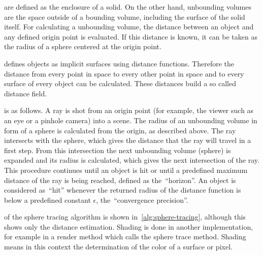 \documentclass[%
    a4paper,    %
    justified,  %
    nobib,      %
    openany     %
]{tufte-book}
\begin{document}
 are defined as the enclosure of a solid. On the
other hand, unbounding volumes are the space outside of a bounding volume,
including the surface of the solid itself. For calculating a unbounding volume,
the distance between an object and any defined origin point is evaluated. If
this distance is known, it can be taken as the radius of a sphere centered at
the origin point.

 defines objects as implicit surfaces using distance
functions. Therefore the distance from every point in space to every other point
in space and to every surface of every object can be calculated. These distances
build a so called distance field.

 is as follows. A ray is shot
from an origin point (for example, the viewer such as an eye or a pinhole camera) into a scene.
The radius of an unbounding volume in form of a sphere is calculated from
the origin, as described above. The ray intersects with the sphere, which gives
the distance that the ray will travel in a first step. From this
intersection the next unbounding volume (sphere) is expanded and its radius is
calculated, which gives the next intersection of the ray. This procedure
continues until an object is hit or until a predefined maximum distance of
the ray is being reached, defined as the~\enquote{horizon}. An object is
considered as~\enquote{hit} whenever the
returned radius of the distance function is below a predefined constant
$\epsilon$, the~\enquote{convergence precision}.

 of the sphere tracing algorithm is shown
in~\autoref{alg:sphere-tracing}, although this shows only the distance
estimation. Shading is done in another implementation, for example in a
render method which calls the sphere trace method. Shading means in this context
the determination of the color of a surface or pixel.
\end{document}
